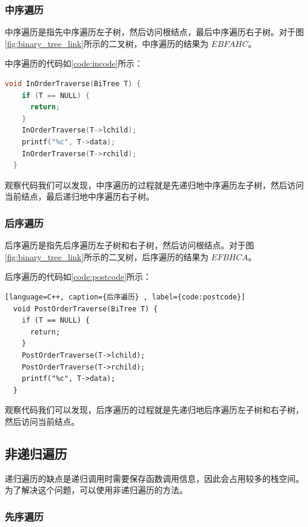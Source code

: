 \documentclass[lang=cn,newtx,10pt,scheme=chinese]{elegantbook}
\begin{document}
\subsubsection{中序遍历}

中序遍历是指先中序遍历左子树，然后访问根结点，最后中序遍历右子树。对于图\ref{fig:binary_tree_link}所示的二叉树，中序遍历的结果为 $EBFAHC$。

中序遍历的代码如\ref{code:incode}所示：

\begin{lstlisting}[language=C++, caption={中序遍历}, label={code:incode}]
  void InOrderTraverse(BiTree T) {
    if (T == NULL) {
      return;
    }
    InOrderTraverse(T->lchild);
    printf("%c", T->data);
    InOrderTraverse(T->rchild);
  }

\end{lstlisting}

观察代码我们可以发现，中序遍历的过程就是先递归地中序遍历左子树，然后访问当前结点，最后递归地中序遍历右子树。
\subsubsection{后序遍历}


后序遍历是指先后序遍历左子树和右子树，然后访问根结点。对于图\ref{fig:binary_tree_link}所示的二叉树，后序遍历的结果为 $EFBHCA$。

后序遍历的代码如\ref{code:postcode}所示：

\begin{lstlisting}[language=C++, caption={后序遍历} , label={code:postcode}]
  void PostOrderTraverse(BiTree T) {
    if (T == NULL) {
      return;
    }
    PostOrderTraverse(T->lchild);
    PostOrderTraverse(T->rchild);
    printf("%c", T->data);
  }

\end{lstlisting}

观察代码我们可以发现，后序遍历的过程就是先递归地后序遍历左子树和右子树，然后访问当前结点。
\subsection{非递归遍历}

递归遍历的缺点是递归调用时需要保存函数调用信息，因此会占用较多的栈空间。为了解决这个问题，可以使用非递归遍历的方法。


\subsubsection{先序遍历}
\end{document}
